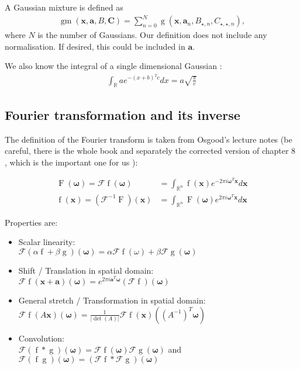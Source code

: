 \documentclass{paper}
\newcommand{\abs}[1]{\left| #1 \right|}
\newcommand{\F}{\ensuremath{\mathcal{F}}}
\newcommand{\vr}[1]{\ensuremath{\boldsymbol{#1}}}
\newcommand{\tr}[1]{\ensuremath{\boldsymbol{#1}}}
\newcommand{\f}[1]{\operatorname{#1}}
\newcommand{\omegavec}[0]{\ensuremath{\vr{\omega{}}}}
\newcommand{\avec}[0]{\ensuremath{\vr{a}}}
\newcommand{\xvec}[0]{\ensuremath{\vr{x}}}
\begin{document}
A Gaussian mixture is defined as
\begin{align}
	\f{gm}(\vr{x}, \vr{a}, B, \tr{C}) = \sum_{n=0}^{N} \f{g}(\vr{x}, \vr{a}_n, B_{\star, n}, C_{\star, \star, n}),
\end{align}
where $N$ is the number of Gaussians.
Our definition does not include any normalisation.
If desired, this could be included in $\vr{a}$.

We also know the integral of a single dimensional Gaussian \cite{wiki_gaussian_int}:
\begin{align}
	\label{eq:gaussian_integral}
	\int_{\mathbb{R}} a e^{-(x+b)^2 c} dx = a\sqrt{\frac{\pi}{c}}
\end{align}

\subsection*{Fourier transformation and its inverse}
The definition of the Fourier transform is taken from Osgood's lecture notes (be careful, there is the whole book \cite{osgood_book} and separately the corrected version of chapter 8 \cite{osgood_chapter8}, which is the important one for us ):

\begin{align}
	\f{F} (\vr{\omega}) = \F \f{f} (\vr{\omega}) &= \int_{\mathbb{R}^n} \f{f}(\vr{x}) e^{-2 \pi i \vr{\omega}^T \vr{x}} d\vr{x} \\
	\f{f} (\vr{x}) = (\F^{-1} \f{F}) (\vr{x}) &= \int_{\mathbb{R}^n} \f{F}(\vr{\omega}) e^{2 \pi i \vr{\omega}^T \vr{x}} d\vr{x}
\end{align}

Properties are:
\begin{itemize}
	\item Scalar linearity: \\
	      $\F(\alpha \f{f} + \beta \f{g})(\omegavec) = \alpha \F \f{f}(\omega) + \beta \F \f{g}(\omegavec)$
	\item Shift / Translation in spatial domain: \\
	      $\F\f{f}(\xvec + \avec)(\omegavec) = e^{2 \pi i \avec^T \omegavec} (\F \f{f})(\omegavec)$
	\item General stretch / Transformation in spatial domain:\\
		  $\F\f{f}(A\vr{x})(\omegavec) = \frac{1}{\abs{\det(A)}} \F \f{f}(\xvec)((A^{-1})^T\omegavec)$
	\item Convolution:\\
		  $\F(\f{f}\ast\f{g})(\omegavec) = \F\f{f}(\omegavec) \F\f{g}(\omegavec)$ and $\F(\f{f}\f{g})(\omegavec) = (\F\f{f} \ast \F\f{g})(\omegavec)$
\end{itemize}
\end{document}

